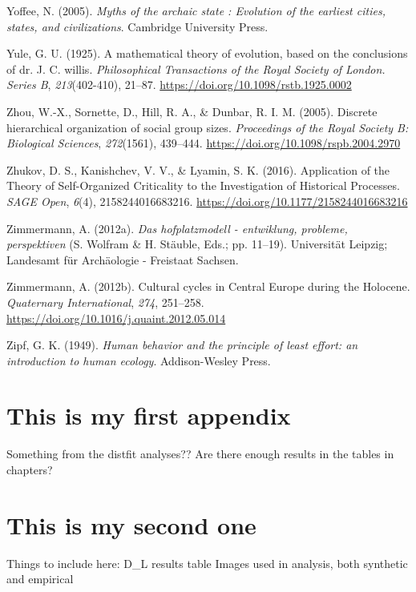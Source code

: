 \documentclass[
  12pt,
]{book}
\newlength{\cslhangindent}
\newlength{\cslentryspacingunit} %
\newenvironment{CSLReferences}[2] %
 {%
  \setlength{\parindent}{0pt}
  \ifodd #1
  \let\oldpar\par
  \def\par{\hangindent=\cslhangindent\oldpar}
  \fi
  \setlength{\parskip}{#2\cslentryspacingunit}
 }%
 {}
\begin{document}
\begin{CSLReferences}{1}{0}
\leavevmode{}%
Yoffee, N. (2005). \emph{Myths of the archaic state : Evolution of the earliest cities, states, and civilizations}. Cambridge University Press.

\leavevmode{}%
Yule, G. U. (1925). A mathematical theory of evolution, based on the conclusions of dr. J. C. willis. \emph{Philosophical Transactions of the Royal Society of London. Series B}, \emph{213}(402-410), 21--87. \url{https://doi.org/10.1098/rstb.1925.0002}

\leavevmode{}%
Zhou, W.-X., Sornette, D., Hill, R. A., \& Dunbar, R. I. M. (2005). Discrete hierarchical organization of social group sizes. \emph{Proceedings of the Royal Society B: Biological Sciences}, \emph{272}(1561), 439--444. \url{https://doi.org/10.1098/rspb.2004.2970}

\leavevmode{}%
Zhukov, D. S., Kanishchev, V. V., \& Lyamin, S. K. (2016). Application of the {Theory} of {Self-Organized Criticality} to the {Investigation} of {Historical Processes}. \emph{SAGE Open}, \emph{6}(4), 2158244016683216. \url{https://doi.org/10.1177/2158244016683216}

\leavevmode{}%
Zimmermann, A. (2012a). \emph{Das hofplatzmodell - entwiklung, probleme, perspektiven} (S. Wolfram \& H. Stäuble, Eds.; pp. 11--19). Universität Leipzig; Landesamt für Archäologie - Freistaat Sachsen.

\leavevmode{}%
Zimmermann, A. (2012b). Cultural cycles in {Central Europe} during the {Holocene}. \emph{Quaternary International}, \emph{274}, 251--258. \url{https://doi.org/10.1016/j.quaint.2012.05.014}

\leavevmode{}%
Zipf, G. K. (1949). \emph{Human behavior and the principle of least effort: an introduction to human ecology}. Addison-Wesley Press.

\end{CSLReferences}

\hypertarget{appendix-appendix}{%
\appendix {}}


\hypertarget{this-is-my-first-appendix}{%
\chapter{This is my first appendix}\label{this-is-my-first-appendix}}

Something from the distfit analyses??
Are there enough results in the tables in chapters?

\hypertarget{this-is-my-second-one}{%
\chapter{This is my second one}\label{this-is-my-second-one}}

Things to include here:
D\_L results table
Images used in analysis, both synthetic and empirical
\end{document}
